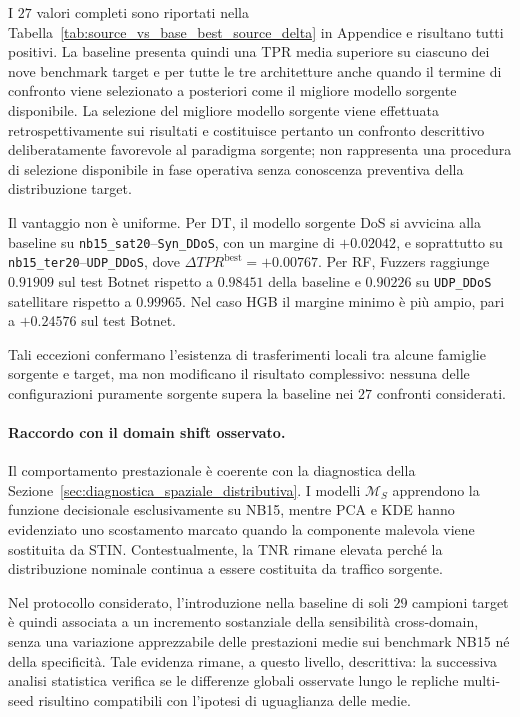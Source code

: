 I $27$ valori completi sono riportati nella Tabella~\ref{tab:source_vs_base_best_source_delta} in Appendice e risultano tutti positivi. 
La baseline presenta quindi una TPR media superiore su ciascuno dei nove benchmark target e per tutte le tre architetture anche quando il termine di confronto viene selezionato a posteriori come il migliore modello sorgente disponibile.
La selezione del migliore modello sorgente viene effettuata retrospettivamente sui risultati e costituisce pertanto un confronto descrittivo deliberatamente favorevole al paradigma sorgente; non rappresenta una procedura di selezione disponibile in fase operativa senza conoscenza preventiva della distribuzione target.

Il vantaggio non è uniforme. 
Per DT, il modello sorgente DoS si avvicina alla baseline su \texttt{nb15\_sat20}--\texttt{Syn\_DDoS}, con un margine di $+0.02042$, e soprattutto su
\texttt{nb15\_ter20}--\texttt{UDP\_DDoS}, dove $\Delta TPR^{\mathrm{best}}=+0.00767$. 
Per RF, Fuzzers raggiunge $0.91909$ sul test Botnet rispetto a $0.98451$ della baseline e $0.90226$ su \texttt{UDP\_DDoS} satellitare rispetto a $0.99965$. 
Nel caso HGB il margine minimo è più ampio, pari a $+0.24576$ sul test Botnet.

Tali eccezioni confermano l'esistenza di trasferimenti locali tra alcune famiglie sorgente e target, ma non modificano il risultato complessivo: nessuna delle configurazioni puramente sorgente supera la baseline nei $27$ confronti considerati.

\paragraph{Raccordo con il domain shift osservato.}
Il comportamento prestazionale è coerente con la diagnostica della Sezione~\ref{sec:diagnostica_spaziale_distributiva}. 
I modelli $\mathcal{M}_{S}$ apprendono la funzione decisionale esclusivamente su NB15, mentre PCA e KDE hanno evidenziato uno scostamento marcato quando la componente malevola viene sostituita da STIN. 
Contestualmente, la TNR rimane elevata perché la distribuzione nominale continua a essere costituita da traffico sorgente.

Nel protocollo considerato, l'introduzione nella baseline di soli $29$ campioni target è quindi associata a un incremento sostanziale della sensibilità cross-domain, senza una variazione apprezzabile delle prestazioni medie sui benchmark NB15 né della specificità. 
Tale evidenza rimane, a questo livello, descrittiva: la successiva analisi statistica verifica se le differenze globali osservate lungo le repliche multi-seed risultino compatibili con l'ipotesi di uguaglianza delle medie.

